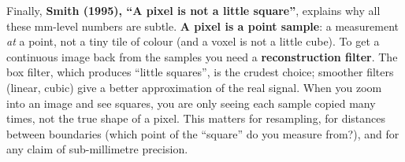 \documentclass[a4paper]{article}
\newcommand{\K}[1]{\textcolor{kg}{\textbf{#1}}}
\begin{document}
Finally, \K{Smith (1995), ``A pixel is not a little square''}, explains why all these mm-level numbers are subtle. \K{A pixel is a point sample}: a measurement \emph{at} a point, not a tiny tile of colour (and a voxel is not a little cube). To get a continuous image back from the samples you need a \K{reconstruction filter}. The box filter, which produces ``little squares'', is the crudest choice; smoother filters (linear, cubic) give a better approximation of the real signal. When you zoom into an image and see squares, you are only seeing each sample copied many times, not the true shape of a pixel. This matters for resampling, for distances between boundaries (which point of the ``square'' do you measure from?), and for any claim of sub-millimetre precision.
\end{document}
